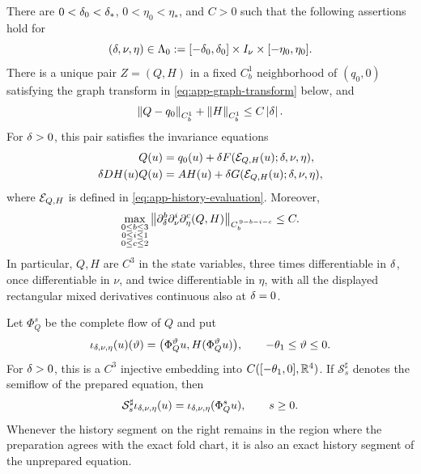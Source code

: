 \begin{proposition}
\label{prop:app-fixed-tube-graph}
There are \(0<\delta_0<\delta_*\), \(0<\eta_0<\eta_*\), and \(C>0\) such that
the following assertions hold for
\[
 (\delta,\nu,\eta)\in
 \Lambda_0:=[-\delta_0,\delta_0]\times I_\nu\times[-\eta_0,\eta_0].
\]
There is a unique pair \(Z=(Q,H)\) in a fixed \(C_b^1\) neighborhood of
\((q_0,0)\) satisfying the graph transform in
\cref{eq:app-graph-transform} below, and
\begin{equation}
\label{eq:app-C1-smallness}
 \left\lVert Q-q_0\right\rVert_{C_b^1}+\left\lVert H\right\rVert_{C_b^1}\leq C\left\lvert \delta\right\rvert.
\end{equation}
For \(\delta>0\), this pair satisfies the invariance equations
\begin{equation}
\label{eq:app-invariance-equations}
\begin{aligned}
 Q(u)&=q_0(u)+\delta F(\mathcal E_{Q,H}(u);\delta,\nu,\eta),\\
 \delta DH(u)Q(u)&=AH(u)
       +\delta G(\mathcal E_{Q,H}(u);\delta,\nu,\eta),
\end{aligned}
\end{equation}
where \(\mathcal E_{Q,H}\) is defined in \cref{eq:app-history-evaluation}.
Moreover,
\begin{equation}
\label{eq:app-mixed-jet-bound}
 \max_{\substack{0\leq b\leq3\\0\leq i\leq1\\0\leq c\leq2}}
 \left\lVert \partial_\delta^b\partial_\nu^i\partial_\eta^c(Q,H)\right\rVert
       _{C_b^{\,9-b-i-c}}
 \leq C.
\end{equation}
In particular, \(Q,H\) are \(C^3\) in the state variables, three times
differentiable in \(\delta\), once differentiable in \(\nu\), and twice
differentiable in \(\eta\), with all the displayed rectangular mixed
derivatives continuous also at \(\delta=0\).

Let \(\Phi_Q^s\) be the complete flow of \(Q\) and put
\begin{equation}
\label{eq:app-history-embedding}
 \iota_{\delta,\nu,\eta}(u)(\vartheta)
 =\bigl(\Phi_Q^\vartheta u,
        H(\Phi_Q^\vartheta u)\bigr),
 \qquad -\theta_1\leq\vartheta\leq0.
\end{equation}
For \(\delta>0\), this is a \(C^3\) injective embedding into
\(C([ -\theta_1,0],\mathbb R^4)\).  If \(\mathcal S_s^\sharp\) denotes the
semiflow of the prepared equation, then
\begin{equation}
\label{eq:app-semiconjugacy}
 \mathcal S_s^\sharp\iota_{\delta,\nu,\eta}(u)
 =\iota_{\delta,\nu,\eta}(\Phi_Q^s u),
 \qquad s\geq0.
\end{equation}
Whenever the history segment on the right remains in the region where the
preparation agrees with the exact fold chart, it is also an exact history
segment of the unprepared equation.


\end{proposition}
